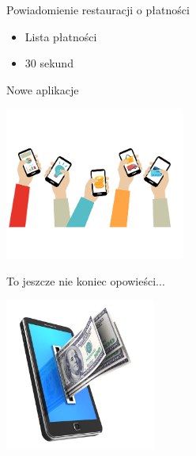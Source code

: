 \documentclass{beamer}
\begin{document}
\begin{frame}{Powiadomienie restauracji o płatności}
	\begin{huge}
		\begin{itemize}[<+->]
			\item Lista płatności
			\item 30 sekund
		\end{itemize}
	\end{huge}
\end{frame}

\begin{frame}{Nowe aplikacje}
	\begin{center}
		\includegraphics[height=5cm]{phone2.png}
	\end{center}
\end{frame}

\begin{frame}{}
	\begin{center}
		\Huge{To jeszcze nie koniec opowieści...}
	\end{center}
\end{frame}

\begin{frame}{}
	\begin{center}
		\includegraphics[height=5cm]{wallet1.jpg}
	\end{center}
\end{frame}
\end{document}
